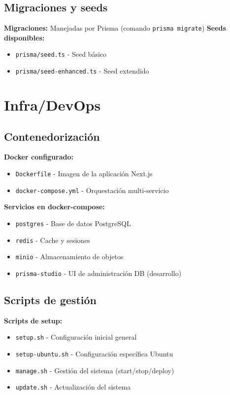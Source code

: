 \documentclass[12pt,a4paper]{article}
\begin{document}
\begin{enumerate}
\subsection{Migraciones y seeds}

\textbf{Migraciones:} Manejadas por Prisma (comando \texttt{prisma migrate})
\textbf{Seeds disponibles:}
\begin{itemize}
    \item \texttt{prisma/seed.ts} - Seed básico
    \item \texttt{prisma/seed-enhanced.ts} - Seed extendido
\end{itemize}

\section{Infra/DevOps}

\subsection{Contenedorización}

\textbf{Docker configurado:}
\begin{itemize}
    \item \texttt{Dockerfile} - Imagen de la aplicación Next.js
    \item \texttt{docker-compose.yml} - Orquestación multi-servicio
\end{itemize}

\textbf{Servicios en docker-compose:}
\begin{itemize}
    \item \texttt{postgres} - Base de datos PostgreSQL
    \item \texttt{redis} - Cache y sesiones
    \item \texttt{minio} - Almacenamiento de objetos
    \item \texttt{prisma-studio} - UI de administración DB (desarrollo)
\end{itemize}

\subsection{Scripts de gestión}

\textbf{Scripts de setup:}
\begin{itemize}
    \item \texttt{setup.sh} - Configuración inicial general
    \item \texttt{setup-ubuntu.sh} - Configuración específica Ubuntu
    \item \texttt{manage.sh} - Gestión del sistema (start/stop/deploy)
    \item \texttt{update.sh} - Actualización del sistema
\end{itemize}


\end{enumerate}
\end{document}
